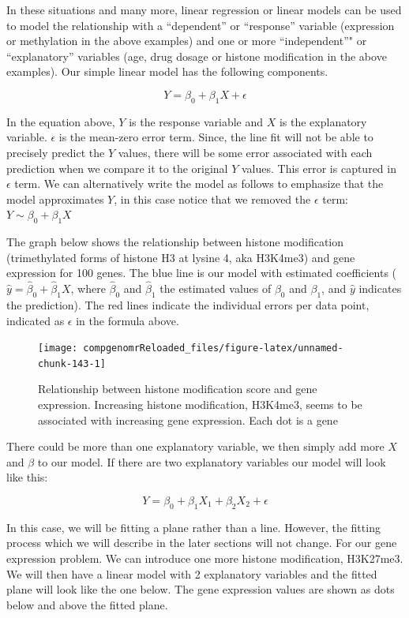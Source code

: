 \documentclass[12pt,]{krantz}
\begin{document}
In these
situations and many more, linear regression or linear models can be used to
model the relationship with a ``dependent'' or ``response'' variable (expression or
methylation
in the above examples) and one or more ``independent''" or ``explanatory'' variables (age, drug dosage or histone modification in the above examples). Our simple linear model has the
following components.

\[  Y= \beta_0+\beta_1X + \epsilon \]

In the equation above, \(Y\) is the response variable and \(X\) is the explanatory
variable. \(\epsilon\) is the mean-zero error term. Since, the line fit will not
be able to precisely predict the \(Y\) values, there will be some error associated
with each prediction when we compare it to the original \(Y\) values. This error
is captured in \(\epsilon\) term. We can alternatively write the model as
follows to emphasize that the model approximates \(Y\), in this case notice that we removed the \(\epsilon\) term: \(Y \sim \beta_0+\beta_1X\)

The graph below shows the relationship between
histone modification (trimethylated forms of histone H3 at lysine 4, aka H3K4me3)
and gene expression for 100 genes. The blue line is our model with estimated
coefficients (\(\hat{y}=\hat{\beta}_0 + \hat{\beta}_1X\), where \(\hat{\beta}_0\)
and \(\hat{\beta}_1\) the estimated values of \(\beta_0\) and
\(\beta_1\), and \(\hat{y}\) indicates the prediction). The red lines indicate the individual
errors per data point, indicated as \(\epsilon\) in the formula above.

\begin{figure}

{\centering \texttt{[image: compgenomrReloaded\_files/figure-latex/unnamed-chunk-143-1]} 

}

\caption{Relationship between histone modification score and gene expression. Increasing histone modification, H3K4me3, seems to be associated with increasing gene expression. Each dot is a gene}\label{fig:unnamed-chunk-143}
\end{figure}

There could be more than one explanatory variable, we then simply add more \(X\)
and \(\beta\) to our model. If there are two explanatory variables our model
will look like this:

\[  Y= \beta_0+\beta_1X_1 +\beta_2X_2 + \epsilon \]

In this case, we will be fitting a plane rather than a line. However, the fitting
process which we will describe in the later sections will not change. For our
gene expression problem. We can introduce one more histone modification, H3K27me3. We will then have a linear model with 2 explanatory variables and the
fitted plane will look like the one below. The gene expression values are shown
as dots below and above the fitted plane.
\end{document}
